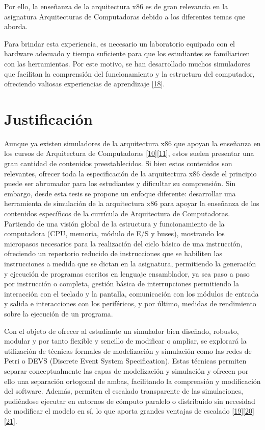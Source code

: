 \documentclass[12pt,twoside]{templates/unerthesis}
\begin{document}
Por ello, la enseñanza de la arquitectura x86 es de gran relevancia en la asignatura Arquitecturas de Computadoras debido a los diferentes temas que aborda.

Para brindar esta experiencia, es necesario un laboratorio equipado con el hardware adecuado y tiempo suficiente para que los estudiantes se familiaricen con las herramientas. Por este motivo, se han desarrollado muchos simuladores que facilitan la comprensión del funcionamiento y la estructura del computador, ofreciendo valiosas experiencias de aprendizaje {[}\protect\hyperlink{ref-skrien_cpu_2001}{18}{]}.

\hypertarget{justificaciuxf3n}{%
\section{Justificación}\label{justificaciuxf3n}}

Aunque ya existen simuladores de la arquitectura x86 que apoyan la enseñanza en los cursos de Arquitectura de Computadoras {[}\protect\hyperlink{ref-radivojevic_design_2011}{10}{]}{[}\protect\hyperlink{ref-nikolic_survey_2009}{11}{]}, estos suelen presentar una gran cantidad de contenidos preestablecidos. Si bien estos contenidos son relevantes, ofrecer toda la especificación de la arquitectura x86 desde el principio puede ser abrumador para los estudiantes y dificultar su comprensión. Sin embargo, desde esta tesis se propone un enfoque diferente: desarrollar una herramienta de simulación de la arquitectura x86 para apoyar la enseñanza de los contenidos específicos de la currícula de Arquitectura de Computadoras. Partiendo de una visión global de la estructura y funcionamiento de la computadora (CPU, memoria, módulo de E/S y buses), mostrando los micropasos necesarios para la realización del ciclo básico de una instrucción, ofreciendo un repertorio reducido de instrucciones que se habiliten las instrucciones a medida que se dictan en la asignatura, permitiendo la generación y ejecución de programas escritos en lenguaje ensamblador, ya sea paso a paso por instrucción o completa, gestión básica de interrupciones permitiendo la interacción con el teclado y la pantalla, comunicación con los módulos de entrada y salida e interacciones con los periféricos, y por último, medidas de rendimiento sobre la ejecución de un programa.

Con el objeto de ofrecer al estudiante un simulador bien diseñado, robusto, modular y por tanto flexible y sencillo de modificar o ampliar, se explorará la utilización de técnicas formales de modelización y simulación como las redes de Petri o DEVS (Discrete Event System Specification). Estas técnicas permiten separar conceptualmente las capas de modelización y simulación y ofrecen por ello una separación ortogonal de ambas, facilitando la comprensión y modificación del software. Además, permiten el escalado transparente de las simulaciones, pudiéndose ejecutar en entornos de cómputo paralelo o distribuido sin necesidad de modificar el modelo en sí, lo que aporta grandes ventajas de escalado {[}\protect\hyperlink{ref-peterson_petri_1981}{19}{]}{[}\protect\hyperlink{ref-zeigler_theory_2000}{20}{]}{[}\protect\hyperlink{ref-zeigler_theory_2018}{21}{]}.
\end{document}
